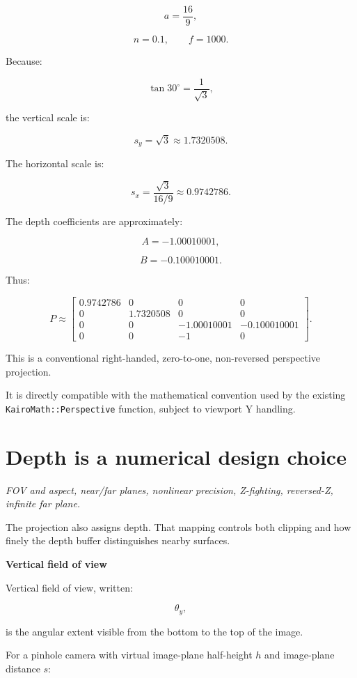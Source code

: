 \[
 a=\frac{16}{9},
\]

\[
 n=0.1,\qquad f=1000.
\]

Because:

\[
 \tan30^\circ=\frac1{\sqrt3},
\]

the vertical scale is:

\[
 s_y=\sqrt3\approx1.7320508.
\]

The horizontal scale is:

\[
 s_x=\frac{\sqrt3}{16/9} \approx0.9742786.
\]

The depth coefficients are approximately:

\[
 A=-1.00010001,
\]

\[
 B=-0.100010001.
\]

Thus:

\[
 \boxed{ P\approx \begin{bmatrix} 0.9742786&0&0&0\\ 0&1.7320508&0&0\\ 0&0&-1.00010001&-0.100010001\\ 0&0&-1&0 \end{bmatrix} }.
\]

This is a conventional right-handed, zero-to-one, non-reversed perspective projection.

It is directly compatible with the mathematical convention used by the existing \texttt{KairoMath::Perspective} function, subject to viewport Y handling.

\section{Depth is a numerical design choice}\label{02-foundations-ii-ch033-depth-is-a-numerical-design-choice}

\hypertarget{02-foundations-ii-ch033-depth-is-a-numerical-design-choice}{}

\emph{FOV and aspect, near/far planes, nonlinear precision, Z-fighting, reversed-Z, infinite far plane.}

The projection also assigns depth. That mapping controls both clipping and how finely the depth buffer distinguishes nearby surfaces.

\textbf{Vertical field of view}

Vertical field of view, written:

\[
 \boxed{\theta_y},
\]

is the angular extent visible from the bottom to the top of the image.

For a pinhole camera with virtual image-plane half-height \(h\) and image-plane distance \(s\):

